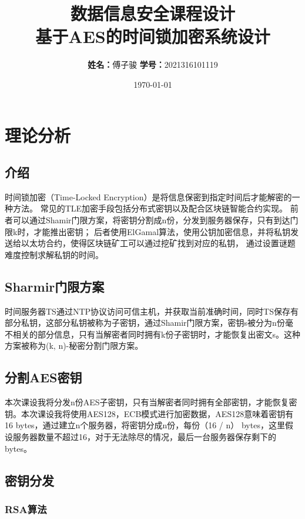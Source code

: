 \documentclass{ctexart}
\title{\textbf{数据信息安全课程设计 \\ 基于AES的时间锁加密系统设计}}
\author{
    \textbf{姓名：}傅子骏
    \textbf{学号：}2021316101119
}
\date{\today}
\begin{document}
\maketitle

\tableofcontents

\newpage

\section{理论分析}

\subsection{介绍}

时间锁加密（Time-Locked Encryption）是将信息保密到指定时间后才能解密的一种方法。
常见的TLE加密手段包括分布式密钥以及配合区块链智能合约实现。
前者可以通过Shamir门限方案，将密钥分割成n份，分发到服务器保存，只有到达门限k时，才能推出密钥；
后者使用ElGamal算法，使用公钥加密信息，并将私钥发送给以太坊合约，使得区块链矿工可以通过挖矿找到对应的私钥，
通过设置谜题难度控制求解私钥的时间。

\subsection{Sharmir门限方案}
时间服务器TS通过NTP协议访问可信主机，并获取当前准确时间，同时TS保存有部分私钥，这部分私钥被称为子密钥，通过Shamir门限方案，密钥s被分为n份毫不相关的部分信息，只有当解密者同时拥有k份子密钥时，才能恢复出密文s。这种方案被称为(k, n)-秘密分割门限方案。

\subsection{分割AES密钥}

本次课设我将分发n份AES子密钥，只有当解密者同时拥有全部密钥，才能恢复密钥。本次课设我将使用AES128，ECB模式进行加密数据，AES128意味着密钥有16 bytes，通过建立n个服务器，将密钥分成n份，每份（16 / n） bytes，这里假设服务器数量不超过16，对于无法除尽的情况，最后一台服务器保存剩下的bytes。

\subsection{密钥分发}

\subsubsection{RSA算法}
\end{document}
